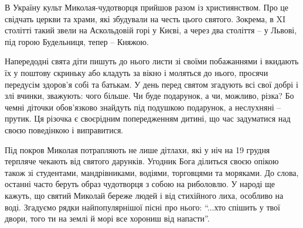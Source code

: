 В Україну культ Миколая-чудотворця прийшов разом із християнством. Про це
свідчать церкви та храми, які збудували на честь цього святого. Зокрема, в XI
столітті такий звели на Аскольдовій горі у Києві, а через два століття – у
Львові, під горою Будельниця, тепер – Княжою.

Напередодні свята діти пишуть до нього листи зі своїми побажаннями і вкидають
їх у поштову скриньку або кладуть за вікно і моляться до нього, просячи
передусім здоров'я собі та батькам. У день перед святом згадують всі свої добрі
і злі вчинки, зважують: чого більше. Чи буде подарунок, а чи, можливо, різка?
Бо чемні діточки обов'язково знайдуть під подушкою подарунок, а неслухняні –
прутик. Ця різочка є своєрідним попередженням дитині, що час задуматися над
своєю поведінкою і виправитися.

Під покров Миколая потрапляють не лише дітлахи, які у ніч на 19 грудня терпляче
чекають від святого дарунків. Угодник Бога ділиться своєю опікою також зі
студентами, мандрівниками, водіями, торговцями та моряками. До слова, останні
часто беруть образ чудотворця з собою на риболовлю. У народі ще кажуть, що
святий Миколай береже людей і від стихійного лиха, особливо на воді. Згадуємо
рядки найпопулярнішої пісні про нього: \enquote{...хто спішить у твої двори, того ти на
землі й морі все хорониш від напасти}.

\clearpage
